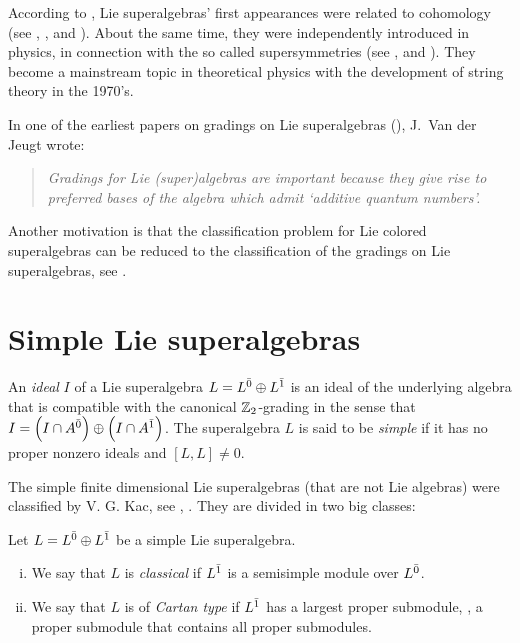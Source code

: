 According to \cite{Freund:1986ws}, Lie superalgebras' first appearances were related to cohomology (see  \cite{FN56}, \cite{Gen63}, \cite{Gen64} and \cite{MM65}). About the same time, they were independently introduced in physics, in connection with the so called supersymmetries (see \cite{GN64}, \cite{Miy68} and \cite{Mic69}). They become a mainstream topic in theoretical physics with the development of string theory in the 1970's.

In one of the earliest papers on gradings on Lie superalgebras (\cite{MR974693}), J.~Van der Jeugt wrote:

\begin{quote}\emph{Gradings for Lie (super)algebras are important because they give rise to preferred bases of the algebra which admit `additive quantum numbers'.}\end{quote}

Another motivation is that the classification problem for Lie colored superalgebras can be reduced to the classification of the gradings on Lie superalgebras, see \cite{MR2497949}.

\section{Simple Lie superalgebras}

An \emph{ideal} $I$ of a Lie superalgebra $L=L^{\bar0}\oplus L^{\bar1}$ is an ideal of the underlying algebra that is compatible with the canonical $\mathbb{Z}_{2}$-grading in the sense that $I=\left(I\cap A^{\bar0} \right) \oplus \left(I\cap A^{\bar1} \right)$. The superalgebra $L$ is said to be \emph{simple} if it has no proper nonzero ideals and $[L,L]\neq 0$.

The simple finite dimensional Lie superalgebras (that are not Lie algebras) were classified by V. G. Kac, see \cite{artigokac}, \cite{livrosuperalgebra}. They are divided in two big classes:

\begin{defi}
	Let $L=L^{\bar0} \oplus L^{\bar1}$ be a simple Lie superalgebra.
	\begin{enumerate}[(i)]
		\item We say that $L$ is \emph{classical} if $L^{\bar1}$ is a semisimple module over $L^{\bar0}$.
		\item We say that $L$ is of \emph{Cartan type} if $L^{\bar1}$ has a largest proper submodule, \ie, a proper submodule that contains all proper submodules.
	\end{enumerate}

\end{defi}

